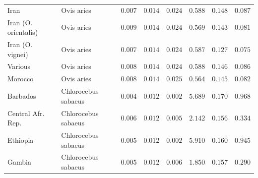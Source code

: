 \documentclass{article}
\begin{document}
\begin{center}
\begin{longtable*}{|l|l|r|r|r|r|r|r|}
            Iran &          Ovis aries &               $ 0.007$ &              $ 0.014$ &              $ 0.024$ &                                          $ 0.588$ &                         $ 0.148$ &                      $ 0.087$ \\
            Iran (O. orientalis) &          Ovis aries &               $ 0.009$ &              $ 0.014$ &              $ 0.024$ &                                          $ 0.569$ &                         $ 0.143$ &                      $ 0.081$ \\
            Iran (O. vignei) &          Ovis aries &               $ 0.007$ &              $ 0.014$ &              $ 0.024$ &                                          $ 0.587$ &                         $ 0.127$ &                      $ 0.075$ \\
            Various &          Ovis aries &               $ 0.008$ &              $ 0.014$ &              $ 0.024$ &                                          $ 0.588$ &                         $ 0.146$ &                      $ 0.086$ \\
            Morocco &          Ovis aries &               $ 0.008$ &              $ 0.014$ &              $ 0.025$ &                                          $ 0.564$ &                         $ 0.145$ &                      $ 0.082$ \\
             Barbados & Chlorocebus sabaeus &               $ 0.004$ &              $ 0.012$ &              $ 0.002$ &                                          $ 5.689$ &                         $ 0.170$ &                      $ 0.968$ \\
             Central Afr. Rep. & Chlorocebus sabaeus &               $ 0.006$ &              $ 0.012$ &              $ 0.005$ &                                          $ 2.142$ &                         $ 0.156$ &                      $ 0.334$ \\
             Ethiopia & Chlorocebus sabaeus &               $ 0.005$ &              $ 0.012$ &              $ 0.002$ &                                          $ 5.910$ &                         $ 0.160$ &                      $ 0.945$ \\
             Gambia & Chlorocebus sabaeus &               $ 0.005$ &              $ 0.012$ &              $ 0.006$ &                                          $ 1.850$ &                         $ 0.157$ &                      $ 0.290$ \\

\end{longtable*}
\end{center}
\end{document}
